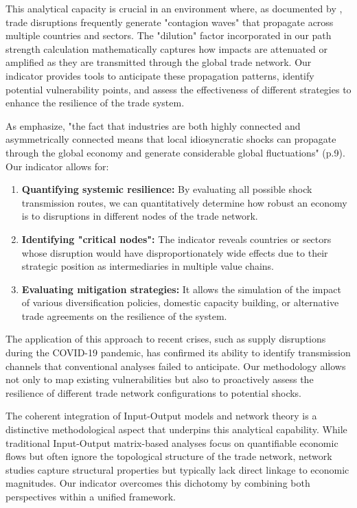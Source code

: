 \documentclass[final,1p,times,authoryear]{elsarticle}
\begin{document}
This analytical capacity is crucial in an environment where, as documented by \cite{Baldwin2020}, trade disruptions frequently generate "contagion waves" that propagate across multiple countries and sectors. The "dilution" factor incorporated in our path strength calculation mathematically captures how impacts are attenuated or amplified as they are transmitted through the global trade network. Our indicator provides tools to anticipate these propagation patterns, identify potential vulnerability points, and assess the effectiveness of different strategies to enhance the resilience of the trade system.

As \cite{Cerina2015} emphasize, "the fact that industries are both highly connected and asymmetrically connected means that local idiosyncratic shocks can propagate through the global economy and generate considerable global fluctuations" (p.9). Our indicator allows for:

\begin{enumerate}
    \item \textbf{Quantifying systemic resilience:} By evaluating all possible shock transmission routes, we can quantitatively determine how robust an economy is to disruptions in different nodes of the trade network.

    \item \textbf{Identifying "critical nodes":} The indicator reveals countries or sectors whose disruption would have disproportionately wide effects due to their strategic position as intermediaries in multiple value chains.

    \item \textbf{Evaluating mitigation strategies:} It allows the simulation of the impact of various diversification policies, domestic capacity building, or alternative trade agreements on the resilience of the system.
\end{enumerate}

The application of this approach to recent crises, such as supply disruptions during the COVID-19 pandemic, has confirmed its ability to identify transmission channels that conventional analyses failed to anticipate. Our methodology allows not only to map existing vulnerabilities but also to proactively assess the resilience of different trade network configurations to potential shocks.

The coherent integration of Input-Output models and network theory is a distinctive methodological aspect that underpins this analytical capability. While traditional Input-Output matrix-based analyses focus on quantifiable economic flows but often ignore the topological structure of the trade network, network studies capture structural properties but typically lack direct linkage to economic magnitudes. Our indicator overcomes this dichotomy by combining both perspectives within a unified framework.
\end{document}

